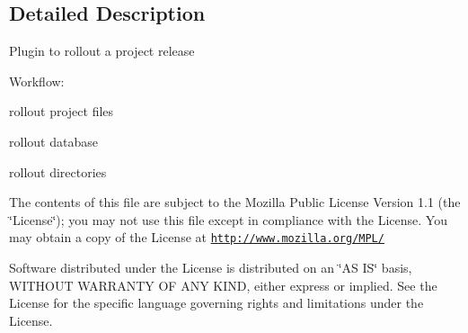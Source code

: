 \subsection{Detailed Description}
Plugin to rollout a project release

Workflow:


\begin{DoxyItemize}
\item rollout project files
\item rollout database
\item rollout directories
\end{DoxyItemize}

The contents of this file are subject to the Mozilla Public License Version 1.1 (the \char`\"{}License\char`\"{}); you may not use this file except in compliance with the License. You may obtain a copy of the License at \href{http://www.mozilla.org/MPL/}{\tt http://www.mozilla.org/MPL/}

Software distributed under the License is distributed on an \char`\"{}AS IS\char`\"{} basis, WITHOUT WARRANTY OF ANY KIND, either express or implied. See the License for the specific language governing rights and limitations under the License. 

